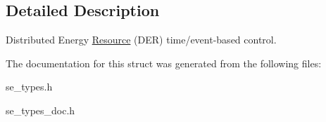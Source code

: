 \subsection{Detailed Description}
Distributed Energy \hyperlink{structResource}{Resource} (D\+ER) time/event-\/based control. 

The documentation for this struct was generated from the following files\+:\begin{DoxyCompactItemize}
\item 
se\+\_\+types.\+h\item 
se\+\_\+types\+\_\+doc.\+h\end{DoxyCompactItemize}
